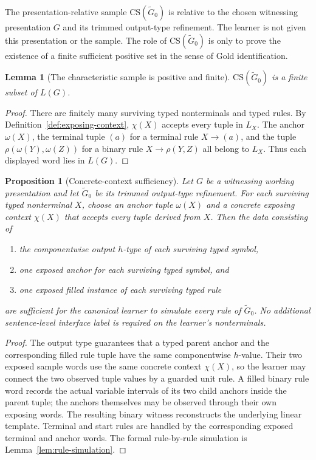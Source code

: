 \documentclass[11pt,a4paper]{article}
\newtheorem{lemma}[theorem]{Lemma}
\newtheorem{proposition}[theorem]{Proposition}
\theoremstyle{remark}
\newcommand{\CS}{\mathrm{CS}}
\begin{document}
The presentation-relative sample \(\CS(\widetilde G_0)\) is relative to the chosen
witnessing presentation \(G\) and its trimmed output-type refinement.  The learner is not
given this presentation or the sample.  The role of \(\CS(\widetilde G_0)\) is
only to prove the existence of a finite sufficient positive set in the sense of
Gold identification.

\begin{lemma}[The characteristic sample is positive and finite]
\label{lem:cs-positive}
\(\CS(\widetilde G_0)\) is a finite subset of \(L(G)\).
\end{lemma}

\begin{proof}
There are finitely many surviving typed nonterminals and typed rules.  By
Definition~\ref{def:exposing-context}, \(\chi(X)\) accepts every tuple in
\(L_X\).  The anchor \(\omega(X)\), the terminal tuple \((a)\) for a terminal
rule \(X\to(a)\), and the tuple \(\rho(\omega(Y),\omega(Z))\) for a binary rule
\(X\to\rho(Y,Z)\) all belong to \(L_X\).  Thus each displayed word lies in
\(L(G)\).
\end{proof}

\begin{proposition}[Concrete-context sufficiency]
\label{prop:concrete-context-sufficiency}
Let \(G\) be a witnessing working presentation and let \(\widetilde G_0\) be
its trimmed output-type refinement.  For each surviving typed nonterminal
\(X\), choose an anchor tuple \(\omega(X)\) and a concrete exposing context
\(\chi(X)\) that accepts every tuple derived from \(X\).  Then the data
consisting of
\begin{enumerate}[label=(\roman*),leftmargin=*]
\item the componentwise output \(h\)-type of each surviving typed symbol,
\item one exposed anchor for each surviving typed symbol, and
\item one exposed filled instance of each surviving typed rule
\end{enumerate}
are sufficient for the canonical learner to simulate every rule of
\(\widetilde G_0\).  No additional sentence-level interface label is required
on the learner's nonterminals.
\end{proposition}

\begin{proof}
The output type guarantees that a typed parent anchor and the corresponding
filled rule tuple have the same componentwise \(h\)-value.  Their two exposed
sample words use the same concrete context \(\chi(X)\), so the learner may
connect the two observed tuple values by a guarded unit rule.  A filled binary
rule word records the actual variable intervals of its two child anchors inside
the parent tuple; the anchors themselves may be observed through their own
exposing words.  The resulting binary witness reconstructs the underlying
linear template.  Terminal and start rules are handled by the corresponding
exposed terminal and anchor words.  The formal rule-by-rule simulation is
Lemma~\ref{lem:rule-simulation}.
\end{proof}
\end{document}
